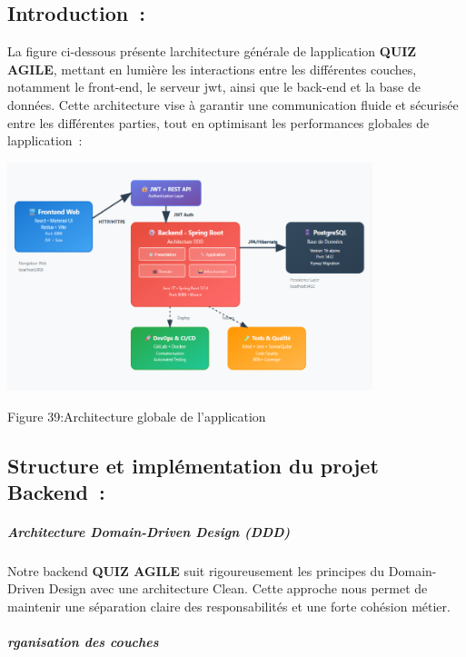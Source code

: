 \documentclass[12pt,a4paper,twoside,openright]{report}
\begin{document}
\hypertarget{introduction}{%
\subsection{Introduction~:}\label{introduction}}

La figure ci-dessous présente l\textquotesingle architecture générale de
l\textquotesingle application \textbf{QUIZ AGILE}, mettant en lumière
les interactions entre les différentes couches, notamment le front-end,
le serveur jwt, ainsi que le back-end et la base de données. Cette
architecture vise à garantir une communication fluide et sécurisée entre
les différentes parties, tout en optimisant les performances globales de
l\textquotesingle application~:

\includegraphics[width=4.19167in,height=2.61667in]{latex_media/media/image45.png}

\protect\hypertarget{_Toc203823449}{}{}Figure 39:Architecture globale de
l'application

\hypertarget{structure-et-impluxe9mentation-du-projet-backend}{%
\subsection{Structure et implémentation du projet
Backend~:}\label{structure-et-impluxe9mentation-du-projet-backend}}

\hypertarget{architecture-domain-driven-design-ddd}{%
\subparagraph{Architecture Domain-Driven Design
(DDD)}\label{architecture-domain-driven-design-ddd}}

Notre backend \textbf{QUIZ AGILE} suit rigoureusement les principes du
Domain-Driven Design avec une architecture Clean. Cette approche nous
permet de maintenir une séparation claire des responsabilités et une
forte cohésion métier.

\hypertarget{rganisation-des-couches}{%
\subparagraph{rganisation des couches}\label{rganisation-des-couches}}
\end{document}
